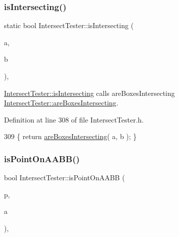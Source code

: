 \subsubsection{\texorpdfstring{is\+Intersecting()}{isIntersecting()}\hspace{0.1cm}{\footnotesize\ttfamily [15/15]}}
{\footnotesize\ttfamily static bool Intersect\+Tester\+::is\+Intersecting (\begin{DoxyParamCaption}\item[{\hyperlink{class_a_a_b_b}{A\+A\+BB}}]{a,  }\item[{\hyperlink{class_a_a_b_b}{A\+A\+BB}}]{b }\end{DoxyParamCaption})\hspace{0.3cm}{\ttfamily [inline]}, {\ttfamily [static]}}



\hyperlink{class_intersect_tester_a7710e17ff7d2e229059f23b9429213f5}{Intersect\+Tester\+::is\+Intersecting} calls are\+Boxes\+Intersecting  \hyperlink{class_intersect_tester_aff69bf4a84e714029204496c2efb0b3b}{Intersect\+Tester\+::are\+Boxes\+Intersecting}. 



Definition at line 308 of file Intersect\+Tester.\+h.


\begin{DoxyCode}
309     \{ \textcolor{keywordflow}{return} \hyperlink{class_intersect_tester_aff69bf4a84e714029204496c2efb0b3b}{areBoxesIntersecting}( a, b ); \}
\end{DoxyCode}
\mbox{\label{class_intersect_tester_a7d951e17cc8d244ea34b3e75d53e5bca}} 
\subsubsection{\texorpdfstring{is\+Point\+On\+A\+A\+B\+B()}{isPointOnAABB()}}
{\footnotesize\ttfamily bool Intersect\+Tester\+::is\+Point\+On\+A\+A\+BB (\begin{DoxyParamCaption}\item[{\hyperlink{class_point}{Point}}]{p,  }\item[{\hyperlink{class_a_a_b_b}{A\+A\+BB}}]{a }\end{DoxyParamCaption})\hspace{0.3cm}{\ttfamily [static]}, {\ttfamily [private]}}



